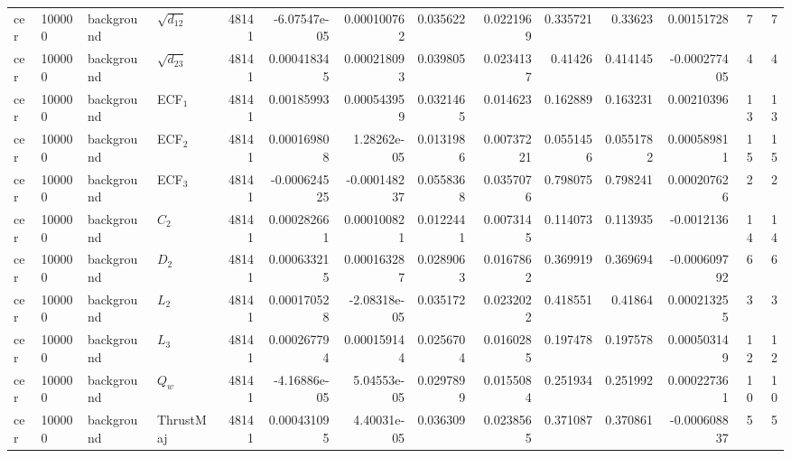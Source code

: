 \begin{landscape}
\begin{longtable}{llll r rrrr rr r rr}
cer & 100000 & background & $\sqrt{d_{12}}$ & 48141 & -6.07547e-05 & 0.000100762 & 0.035622 & 0.0221969 & 0.335721 & 0.33623 & 0.00151728 & 7 & 7 \\
cer & 100000 & background & $\sqrt{d_{23}}$ & 48141 & 0.000418345 & 0.000218093 & 0.039805 & 0.0234137 & 0.41426 & 0.414145 & -0.000277405 & 4 & 4 \\
cer & 100000 & background & ECF$_1$ & 48141 & 0.00185993 & 0.000543959 & 0.0321465 & 0.014623 & 0.162889 & 0.163231 & 0.00210396 & 13 & 13 \\
cer & 100000 & background & ECF$_2$ & 48141 & 0.000169808 & 1.28262e-05 & 0.0131986 & 0.00737221 & 0.0551456 & 0.0551782 & 0.000589811 & 15 & 15 \\
cer & 100000 & background & ECF$_3$ & 48141 & -0.000624525 & -0.000148237 & 0.0558368 & 0.0357076 & 0.798075 & 0.798241 & 0.000207626 & 2 & 2 \\
cer & 100000 & background & $C_2$ & 48141 & 0.000282661 & 0.000100821 & 0.0122441 & 0.0073145 & 0.114073 & 0.113935 & -0.0012136 & 14 & 14 \\
cer & 100000 & background & $D_2$ & 48141 & 0.000633215 & 0.000163287 & 0.0289063 & 0.0167862 & 0.369919 & 0.369694 & -0.000609792 & 6 & 6 \\
cer & 100000 & background & $L_2$ & 48141 & 0.000170528 & -2.08318e-05 & 0.035172 & 0.0232022 & 0.418551 & 0.41864 & 0.000213255 & 3 & 3 \\
cer & 100000 & background & $L_3$ & 48141 & 0.000267794 & 0.000159144 & 0.0256704 & 0.0160285 & 0.197478 & 0.197578 & 0.000503149 & 12 & 12 \\
cer & 100000 & background & $Q_w$ & 48141 & -4.16886e-05 & 5.04553e-05 & 0.0297899 & 0.0155084 & 0.251934 & 0.251992 & 0.000227361 & 10 & 10 \\
cer & 100000 & background & ThrustMaj & 48141 & 0.000431095 & 4.40031e-05 & 0.036309 & 0.0238565 & 0.371087 & 0.370861 & -0.000608837 & 5 & 5 \\
\end{longtable}
\end{landscape}
